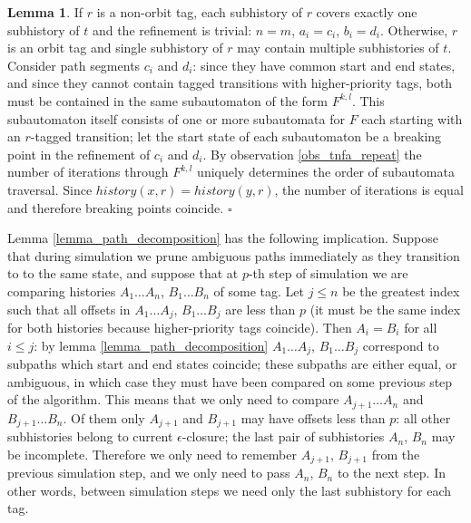 \documentclass{article}
\newcommand{\Xeq}{\!=\!}
\theoremstyle{definition}
\newtheorem{XLem}{Lemma}
\begin{document}
\begin{multicols}{2}
\begin{XLem}
If $r$ is a non-orbit tag, each subhistory of $r$ covers exactly one subhistory of $t$
and the refinement is trivial: $n \Xeq m$, $a_i \Xeq c_i$, $b_i \Xeq d_i$.
Otherwise, $r$ is an orbit tag and single subhistory of $r$ may contain multiple subhistories of $t$.
Consider path segments $c_i$ and $d_i$:
since they have common start and end states, and since they cannot contain tagged transitions with higher-priority tags,
both must be contained in the same subautomaton of the form $F^{k,l}$.
This subautomaton itself consists of one or more subautomata for $F$ each starting with an $r$-tagged transition;
let the start state of each subautomaton be a breaking point in the refinement of $c_i$ and $d_i$.
By observation \ref{obs_tnfa_repeat} the number of iterations through $F^{k,l}$ uniquely determines the order of subautomata traversal.
Since $history(x, r) \Xeq history(y, r)$, the number of iterations is equal and
therefore breaking points coincide.
$\square$
\end{XLem}

Lemma \ref{lemma_path_decomposition} has the following implication.
Suppose that during simulation we prune ambiguous paths immediately as they transition to to the same state,
and suppose that
at $p$-th step of simulation we are comparing histories $A_1 \dots A_n$, $B_1 \dots B_n$ of some tag.
Let $j \!\leq\! n$ be the greatest index such that all offsets in $A_1 \dots A_j$, $B_1 \dots B_j$ are less than $p$
(it must be the same index for both histories because higher-priority tags coincide).
Then $A_i \Xeq B_i$ for all $i \!\leq\! j$:
by lemma \ref{lemma_path_decomposition} $A_1 \dots A_j$, $B_1 \dots B_j$
correspond to subpaths which start and end states coincide;
these subpaths are either equal, or ambiguous, in which case they must have been compared on some previous step of the algorithm.
This means that we only need to compare $A_{j+1} \dots A_n$ and $B_{j+1} \dots B_n$.
Of them only $A_{j+1}$ and $B_{j+1}$ may have offsets less than $p$:
all other subhistories belong to current $\epsilon$-closure;
the last pair of subhistories $A_n$, $B_n$ may be incomplete.
Therefore we only need to remember $A_{j+1}$, $B_{j+1}$ from the previous simulation step,
and we only need to pass $A_n$, $B_n$ to the next step.
In other words, between simulation steps we need only the last subhistory for each tag.
\\


\end{multicols}
\end{document}
